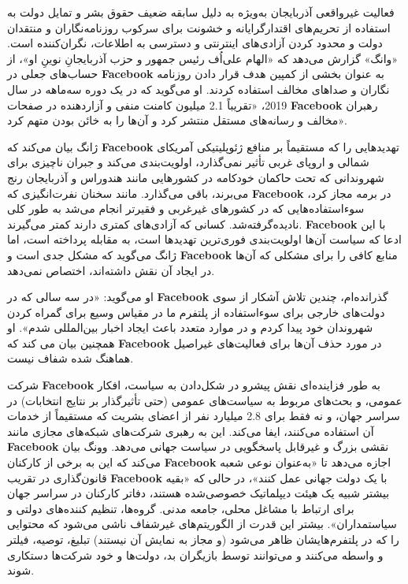 فعالیت غیرواقعی آذربایجان به‌ویژه به دلیل سابقه ضعیف حقوق بشر و تمایل دولت به استفاده از تحریم‌های اقتدارگرایانه و خشونت برای سرکوب روزنامه‌نگاران و منتقدان دولت و محدود کردن آزادی‌های اینترنتی و دسترسی به اطلاعات، نگران‌کننده است.
«وانگ» گزارش می‌دهد که «الهام علی‌اُف رئیس جمهور و حزب آذربایجانِ نوینِ او»، از حساب‌های جعلی در \textenglish{\textbf{Facebook}} به عنوان بخشی از کمپین هدف قرار دادن روزنامه نگاران و صداهای مخالف استفاده کردند.
او می‌گوید که در یک دوره سه‌ماهه در سال 2019، «تقریباً 2.1 میلیون کامنت منفی و آزاردهنده در صفحات \textenglish{\textbf{Facebook}} رهبران مخالف و رسانه‌های مستقل منتشر کرد و آن‌ها را به خائن بودن متهم کرد».

ژانگ بیان می‌کند که \textenglish{\textbf{Facebook}} تهدیدهایی را که مستقیماً بر منافع ژئوپلیتیکی آمریکای شمالی و اروپای غربی تأثیر نمی‌گذارد، اولویت‌بندی می‌کند و جبران ناچیزی برای شهروندانی که تحت حاکمان خودکامه در کشورهایی مانند هندوراس و آذربایجان رنج می‌برند، باقی می‌گذارد.
مانند سخنان نفرت‌انگیزی که \textenglish{\textbf{Facebook}} در برمه مجاز کرد، سوء‌استفاده‌هایی که در کشورهای غیرغربی و فقیرتر انجام می‌شد به طور کلی نادیده‌گرفته‌شد.
کسانی که آزادی‌های کمتری دارند کمتر می‌گیرند.
\textenglish{\textbf{Facebook}} با این ادعا که سیاست آن‌ها اولویت‌بندی فوری‌ترین تهدیدها است، به مقابله پرداخته است، اما ژانگ می‌گوید که مشکل جدی است و \textenglish{\textbf{Facebook}} منابع کافی را برای مشکلی که آن‌ها در ایجاد آن نقش داشته‌اند، اختصاص نمی‌دهد.

او می‌گوید: «در سه سالی که در \textenglish{\textbf{Facebook}} گذرانده‌ام، چندین تلاش آشکار از سوی دولت‌های خارجی برای سوءاستفاده از پلتفرم ما در مقیاس وسیع برای گمراه کردن شهروندان خود پیدا کردم و در موارد متعدد باعث ایجاد اخبار بین‌المللی شدم».
او همچنین بیان می کند که \textenglish{\textbf{Facebook}} در مورد حذف آن‌ها برای فعالیت‌های غیراصیل هماهنگ شده شفاف نیست.

شرکت \textenglish{\textbf{Facebook}} به طور فزاینده‌ای نقش پیشرو در شکل‌دادن به سیاست، افکار عمومی، و بحث‌های مربوط به سیاست‌های عمومی (حتی تأثیرگذار بر نتایج انتخابات) در سراسر جهان، و نه فقط برای 2.8 میلیارد نفر از اعضای بشریت که مستقیماً از خدمات آن استفاده می‌کنند، ایفا می‌کند.
این به رهبری شرکت‌های شبکه‌های مجازی مانند \textenglish{\textbf{Facebook}} نقشی بزرگ و غیرقابل پاسخگویی در سیاست جهانی می‌دهد.
وونگ بیان می‌کند که این به برخی از کارکنان \textenglish{\textbf{Facebook}} اجازه می‌دهد تا «به‌عنوان نوعی شعبه قانون‌گذاری در تقریب \textenglish{\textbf{Facebook}} با یک دولت جهانی عمل کنند»، در حالی که «بقیه بیشتر شبیه یک هیئت دیپلماتیک خصوصی‌شده هستند، دفاتر کارکنان در سراسر جهان برای ارتباط با مشاغل محلی، جامعه مدنی.
گروه‌ها، تنظیم کننده‌های دولتی و سیاستمداران».
بیشتر این قدرت از الگوریتم‌های غیرشفاف ناشی می‌شود که محتوایی را که در پلتفرم‌هایشان ظاهر می‌شود (و مجاز به نمایش آن نیستند) تبلیغ، توصیه، فیلتر و واسطه می‌کنند و می‌توانند توسط بازیگران بد، دولت‌ها و خود شرکت‌ها دستکاری شوند.


